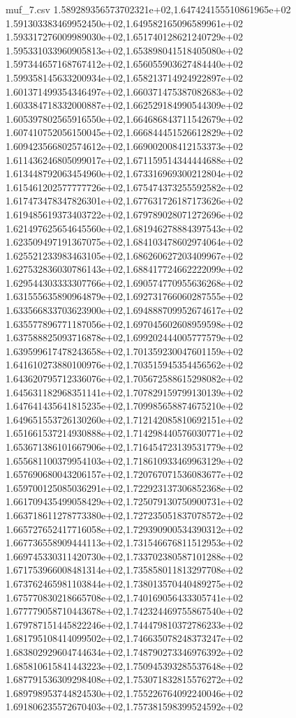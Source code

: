 \begin{filecontents*}{muf_7.csv}
1.589289356573702321e+02,1.647424155510861965e+02
1.591303383469952450e+02,1.649582165096589961e+02
1.593317276009989030e+02,1.651740128621240729e+02
1.595331033960905813e+02,1.653898041518405080e+02
1.597344657168767412e+02,1.656055903627484440e+02
1.599358145633200934e+02,1.658213714924922897e+02
1.601371499354346497e+02,1.660371475387082683e+02
1.603384718332000887e+02,1.662529184990544309e+02
1.605397802565916550e+02,1.664686843711542679e+02
1.607410752056150045e+02,1.666844451526612829e+02
1.609423566802574612e+02,1.669002008412153373e+02
1.611436246805099017e+02,1.671159514344444688e+02
1.613448792063454960e+02,1.673316969300212804e+02
1.615461202577777726e+02,1.675474373255592582e+02
1.617473478347826301e+02,1.677631726187173626e+02
1.619485619373403722e+02,1.679789028071272696e+02
1.621497625654645560e+02,1.681946278884397543e+02
1.623509497191367075e+02,1.684103478602974064e+02
1.625521233983463105e+02,1.686260627203409967e+02
1.627532836030786143e+02,1.688417724662222099e+02
1.629544303333307766e+02,1.690574770955636268e+02
1.631555635890964879e+02,1.692731766060287555e+02
1.633566833703623900e+02,1.694888709952674617e+02
1.635577896771187056e+02,1.697045602608959598e+02
1.637588825093716878e+02,1.699202444005777579e+02
1.639599617478243658e+02,1.701359230047601159e+02
1.641610273880100976e+02,1.703515945354456562e+02
1.643620795712336076e+02,1.705672588615298082e+02
1.645631182968351141e+02,1.707829159799130139e+02
1.647641435641815235e+02,1.709985658874675210e+02
1.649651553726130260e+02,1.712142085810692151e+02
1.651661537214930888e+02,1.714298440576030771e+02
1.653671386101667906e+02,1.716454723139531779e+02
1.655681100379954103e+02,1.718610933469963129e+02
1.657690680043206157e+02,1.720767071536083677e+02
1.659700125085036291e+02,1.722923137306852368e+02
1.661709435499058429e+02,1.725079130750900731e+02
1.663718611278773380e+02,1.727235051837078572e+02
1.665727652417716058e+02,1.729390900534390312e+02
1.667736558909444113e+02,1.731546676811512953e+02
1.669745330311420730e+02,1.733702380587101288e+02
1.671753966008481314e+02,1.735858011813297708e+02
1.673762465981103844e+02,1.738013570440489275e+02
1.675770830218665708e+02,1.740169056433305741e+02
1.677779058710443678e+02,1.742324469755867540e+02
1.679787151445822246e+02,1.744479810372786233e+02
1.681795108414099502e+02,1.746635078248373247e+02
1.683802929604744634e+02,1.748790273346976392e+02
1.685810615841443223e+02,1.750945393285537648e+02
1.687791536309298408e+02,1.753071832815576272e+02
1.689798953744824530e+02,1.755226764092240046e+02
1.691806235572670403e+02,1.757381598399524592e+02

\end{filecontents*}
